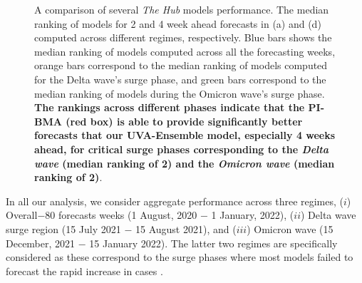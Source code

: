 \documentclass[conference,compsoc]{IEEEtran}
\newcommand{\hub}{\emph{The Hub}}
\begin{document}
\begin{figure}[ht!]
\begin{subfigure}{.47\textwidth}
    \end{subfigure}
        \caption{A comparison of several \hub{} models performance. The median ranking of models for 2 and 4 week ahead forecasts in (a) and (d) computed across different regimes, respectively. Blue bars shows the median ranking of models computed across all the forecasting weeks, orange bars correspond to the median ranking of models computed for the Delta wave's surge phase, and green bars correspond to the median ranking of models during the Omicron wave's surge phase. \textbf{The rankings across different phases indicate that the PI-BMA (red box) is able to provide significantly better forecasts that our UVA-Ensemble model, especially 4 weeks ahead, for critical surge phases corresponding to the \emph{Delta wave} (\textbf{median ranking of 2}) and the \emph{Omicron wave} (\textbf{median ranking of 2})}.  }
\label{fig:match_frac}
\end{figure}
In all our analysis, we consider aggregate performance across three regimes, ($i$) Overall$-$80 forecasts weeks (1 August, 2020 $-$ 1 January, 2022), ($ii$) Delta wave surge region (15 July 2021 $-$ 15 August 2021), and ($iii$) Omicron wave (15 December, 2021 $-$ 15 January 2022). The latter two regimes are specifically considered as these correspond to the surge phases where most models failed to forecast the rapid increase in cases \cite{ray2021challenges}.
\end{document}
